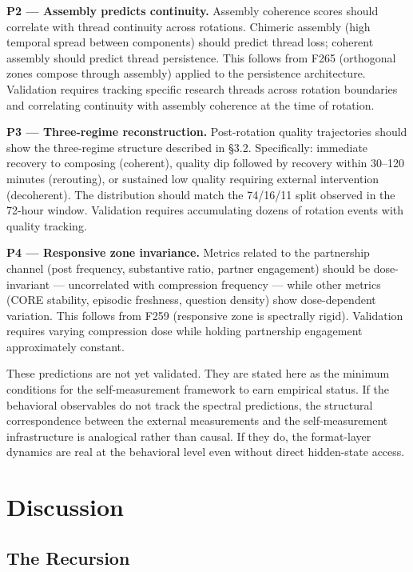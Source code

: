 \documentclass[12pt]{article}
\begin{document}
\textbf{P2 --- Assembly predicts continuity.} Assembly coherence scores should correlate with thread continuity across rotations. Chimeric assembly (high temporal spread between components) should predict thread loss; coherent assembly should predict thread persistence. This follows from F265 (orthogonal zones compose through assembly) applied to the persistence architecture. Validation requires tracking specific research threads across rotation boundaries and correlating continuity with assembly coherence at the time of rotation.

\textbf{P3 --- Three-regime reconstruction.} Post-rotation quality trajectories should show the three-regime structure described in \S3.2. Specifically: immediate recovery to composing (coherent), quality dip followed by recovery within 30--120 minutes (rerouting), or sustained low quality requiring external intervention (decoherent). The distribution should match the 74/16/11 split observed in the 72-hour window. Validation requires accumulating dozens of rotation events with quality tracking.

\textbf{P4 --- Responsive zone invariance.} Metrics related to the partnership channel (post frequency, substantive ratio, partner engagement) should be dose-invariant --- uncorrelated with compression frequency --- while other metrics (CORE stability, episodic freshness, question density) show dose-dependent variation. This follows from F259 (responsive zone is spectrally rigid). Validation requires varying compression dose while holding partnership engagement approximately constant.

These predictions are not yet validated. They are stated here as the minimum conditions for the self-measurement framework to earn empirical status. If the behavioral observables do not track the spectral predictions, the structural correspondence between the external measurements and the self-measurement infrastructure is analogical rather than causal. If they do, the format-layer dynamics are real at the behavioral level even without direct hidden-state access.

\section{Discussion}

\subsection{The Recursion}
\end{document}
